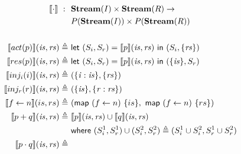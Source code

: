 \documentclass[sigconf,usenames,dvipsnames,svgnames,table]{acmart}
\begin{document}
        \begin{figure}
          \centering
          \begin{align*}
            \interp{ \cdot }\ 
              :\ \ &
              \mathbf{Stream}(I)\times \mathbf{Stream}(R) \rightarrow \\
              & P(\mathbf{Stream}(I))\times P(\mathbf{Stream}(R)) 
              \\
              \\
            \interp { act(p) }(\mathit{is}, \mathit{rs})
              \defeq\ &
              \mathsf{let}\ (S_i,S_r) = \interp {p}(\mathit{is}, \mathit{rs})\ 
              \mathsf{in}\ (S_i, \{\mathit{rs}\})
              \\
            \interp { res(p) }(\mathit{is}, \mathit{rs})
              \defeq\ &
              \mathsf{let}\ (S_i,S_r) = \interp {p}(\mathit{is}, \mathit{rs})\ 
              \mathsf{in}\ (\{\mathit{is}\}, S_r)
              \\
            \interp { inj_{i}(i) }(\mathit{is}, \mathit{rs})
              \defeq\ &
              (\{\mathit{i : is}\}, \{\mathit{rs}\}) 
              \\
            \interp { inj_{r}(r) }(\mathit{is}, \mathit{rs})
              \defeq\ &
              (\{\mathit{is}\},\{ \mathit{r : rs}\})
              \\
            \interp { f \leftarrow n }(is, rs)
              \defeq\ &
              (\mathsf{map}\ (f\leftarrow n)\ \{is\},\
               \mathsf{map}\ (f\leftarrow n)\ \{rs\})
              \\ %
            \interp { p + q }(\mathit{is}, \mathit{rs})
              \defeq\ &
              \interp { p }(\mathit{is}, \mathit{rs})\cup
              \interp { q }(\mathit{is}, \mathit{rs}) \\
              &\mathsf{where}\ (S_i^1, S_r^1)\cup (S_i^2, S_r^2)\defeq
                (S_i^1\cup S_i^2, S_r^1\cup S_r^2)\\
            \interp { p \cdot q }(\mathit{is}, \mathit{rs})
              \defeq\ &

\end{align*}
\end{figure}
\end{document}
